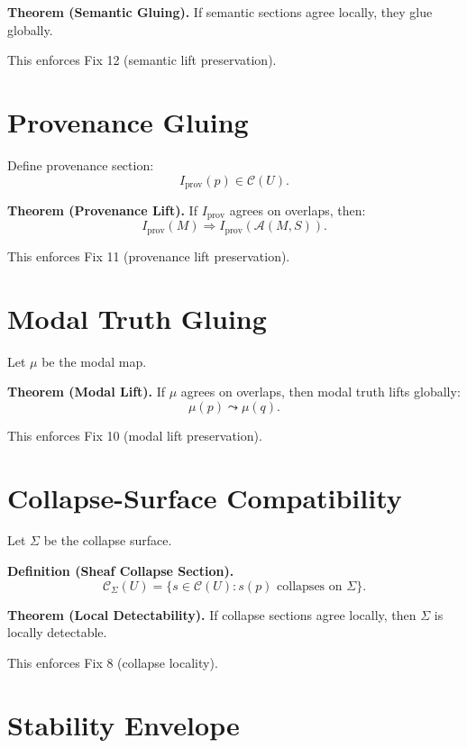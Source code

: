 \documentclass[11pt]{article}
\begin{document}
\textbf{Theorem (Semantic Gluing).}
If semantic sections agree locally, they glue globally.

This enforces Fix 12 (semantic lift preservation).

\section{Provenance Gluing}

Define provenance section:
\[
I_{\mathrm{prov}}(p) \in \mathcal{C}(U).
\]

\textbf{Theorem (Provenance Lift).}
If $I_{\mathrm{prov}}$ agrees on overlaps, then:
\[
I_{\mathrm{prov}}(M) \Rightarrow I_{\mathrm{prov}}(\mathcal{A}(M,S)).
\]

This enforces Fix 11 (provenance lift preservation).

\section{Modal Truth Gluing}

Let $\mu$ be the modal map.

\textbf{Theorem (Modal Lift).}
If $\mu$ agrees on overlaps, then modal truth lifts globally:
\[
\mu(p) \leadsto \mu(q).
\]

This enforces Fix 10 (modal lift preservation).

\section{Collapse-Surface Compatibility}

Let $\Sigma$ be the collapse surface.

\textbf{Definition (Sheaf Collapse Section).}
\[
\mathcal{C}_\Sigma(U) = \{s \in \mathcal{C}(U) : s(p) \text{ collapses on } \Sigma\}.
\]

\textbf{Theorem (Local Detectability).}
If collapse sections agree locally, then $\Sigma$ is locally detectable.

This enforces Fix 8 (collapse locality).

\section{Stability Envelope}
\end{document}
